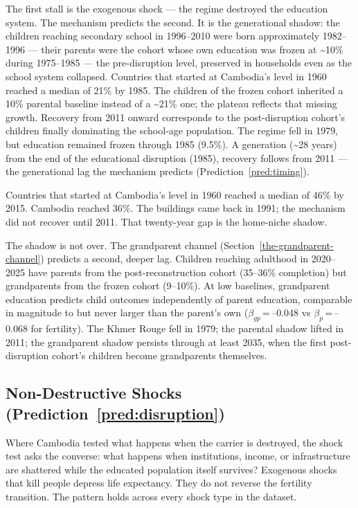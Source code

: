\documentclass[12pt,letterpaper]{article}
\begin{document}
The first stall is the exogenous shock --- the regime destroyed the
education system. The mechanism predicts the second. It is the
generational shadow:
the children reaching secondary school in 1996--2010 were born
approximately 1982--1996 --- their parents were the cohort whose own
education was frozen at \textasciitilde10\% during 1975--1985 --- the
pre-disruption level, preserved in households even as the school system
collapsed. Countries that started at Cambodia's level in 1960 reached a
median of 21\% by 1985. The children of the frozen cohort inherited a
10\% parental baseline instead of a \textasciitilde21\% one; the plateau
reflects that missing growth. Recovery
from 2011 onward corresponds to the post-disruption cohort's children
finally dominating the school-age population. The regime fell in 1979,
but education remained frozen through 1985 (9.5\%). A generation
(\textasciitilde28 years) from the end of the educational disruption (1985), recovery follows from 2011 --- the generational lag the mechanism predicts (Prediction~\ref{pred:timing}).

Countries that started at Cambodia's level in 1960 reached a median of
46\% by 2015. Cambodia reached 36\%. The buildings came back in 1991;
the mechanism did not recover until 2011. That twenty-year gap is the home-niche shadow.

The shadow is not over. The grandparent channel
(Section~\ref{the-grandparent-channel}) predicts a second, deeper lag.
Children reaching adulthood in 2020--2025 have parents from the
post-reconstruction cohort (35--36\% completion) but grandparents from
the frozen cohort (9--10\%). At low baselines, grandparent education
predicts child outcomes independently of parent education, comparable
in magnitude to but never larger than the parent's own
($\beta_{gp}$\,=\,--0.048 vs $\beta_p$\,=\,--0.068 for fertility).
The Khmer Rouge fell in 1979; the parental shadow lifted in 2011;
the grandparent shadow persists through at least 2035, when the first
post-disruption cohort's children become grandparents themselves.


\subsection{Non-Destructive Shocks (Prediction~\ref{pred:disruption})}\label{the-shock-test}

Where Cambodia tested what happens when the carrier is destroyed,
the shock test asks the converse: what happens when institutions,
income, or infrastructure are shattered while the educated population
itself survives? Exogenous shocks that kill people depress life
expectancy. They do not reverse the fertility transition. The pattern holds across every shock type in the dataset.
\end{document}
